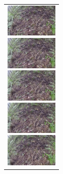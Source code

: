 \begin{figure}[htbp]
    \begin{tabular}{l}
      \begin{minipage}{0.165\hsize}
        \begin{center}
          \includegraphics[clip, width=2.5cm]{./Figures/still_stop1-1.eps}
        \end{center}
      \end{minipage}
      \begin{minipage}{0.165\hsize}
        \begin{center}
          \includegraphics[clip, width=2.5cm]{./Figures/still_stop1-2.eps}
        \end{center}
      \end{minipage}
      \begin{minipage}{0.165\hsize}
        \begin{center}
          \includegraphics[clip, width=2.5cm]{./Figures/still_stop1-3.eps}
        \end{center}
      \end{minipage}
      \begin{minipage}{0.165\hsize}
        \begin{center}
          \includegraphics[clip, width=2.5cm]{./Figures/still_stop1-4.eps}
        \end{center}
      \end{minipage}
      \begin{minipage}{0.165\hsize}
        \begin{center}
          \includegraphics[clip, width=2.5cm]{./Figures/still_stop1-5.eps}

\end{center}
\end{minipage}
\end{tabular}
\end{figure}
